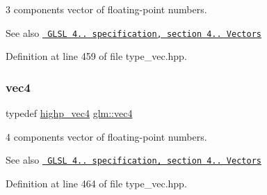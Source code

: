 3 components vector of floating-\/point numbers.

\begin{DoxySeeAlso}{See also}
\href{http://www.opengl.org/registry/doc/GLSLangSpec.4.20.8.pdf}{\texttt{ G\+L\+SL 4.. specification, section 4.. Vectors}} 
\end{DoxySeeAlso}


Definition at line 459 of file type\+\_\+vec.\+hpp.

\mbox{\label{group__core__types_ga5881b1b022d7fd1b7218f5916532dd02}} 
\subsubsection{\texorpdfstring{vec4}{vec4}}
{\footnotesize\ttfamily typedef \mbox{\hyperlink{group__core__precision_ga5f573b0132805b54cb9205eea1c86483}{highp\+\_\+vec4}} \mbox{\hyperlink{group__core__types_ga5881b1b022d7fd1b7218f5916532dd02}{glm\+::vec4}}}

4 components vector of floating-\/point numbers.

\begin{DoxySeeAlso}{See also}
\href{http://www.opengl.org/registry/doc/GLSLangSpec.4.20.8.pdf}{\texttt{ G\+L\+SL 4.. specification, section 4.. Vectors}} 
\end{DoxySeeAlso}


Definition at line 464 of file type\+\_\+vec.\+hpp.

